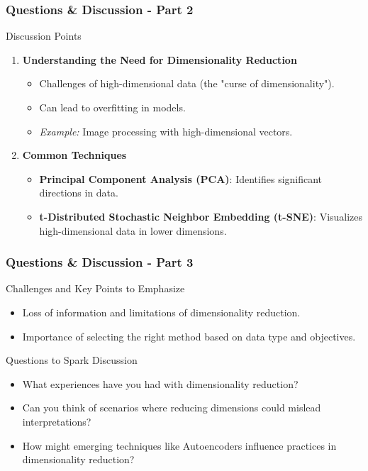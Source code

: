 \documentclass[aspectratio=169]{beamer}
\begin{document}
\begin{frame}[fragile]
  \frametitle{Questions \& Discussion - Part 2}
  \begin{block}{Discussion Points}
    \begin{enumerate}
      \item \textbf{Understanding the Need for Dimensionality Reduction}
      \begin{itemize}
        \item Challenges of high-dimensional data (the "curse of dimensionality").
        \item Can lead to overfitting in models.
        \item \textit{Example:} Image processing with high-dimensional vectors.
      \end{itemize}
      
      \item \textbf{Common Techniques}
      \begin{itemize}
        \item \textbf{Principal Component Analysis (PCA)}: Identifies significant directions in data.
        \item \textbf{t-Distributed Stochastic Neighbor Embedding (t-SNE)}: Visualizes high-dimensional data in lower dimensions.
      \end{itemize}
    \end{enumerate}
  \end{block}
\end{frame}

\begin{frame}[fragile]
  \frametitle{Questions \& Discussion - Part 3}
  \begin{block}{Challenges and Key Points to Emphasize}
    \begin{itemize}
      \item Loss of information and limitations of dimensionality reduction.
      \item Importance of selecting the right method based on data type and objectives.
    \end{itemize}
  \end{block}
  
  \begin{block}{Questions to Spark Discussion}
    \begin{itemize}
      \item What experiences have you had with dimensionality reduction?
      \item Can you think of scenarios where reducing dimensions could mislead interpretations?
      \item How might emerging techniques like Autoencoders influence practices in dimensionality reduction?
    \end{itemize}
  \end{block}
\end{frame}
\end{document}
